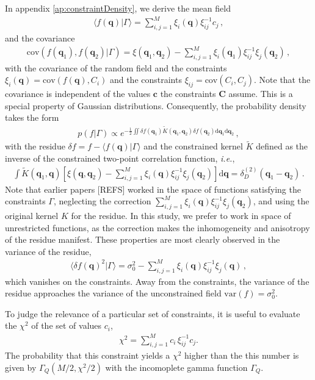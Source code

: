\documentclass[a4paper, 11pt]{article}
\begin{document}
In appendix \ref{ap:constraintDensity}, we derive the mean field
\begin{align}
\langle f(\bm{q})|\Gamma\rangle = \sum_{i,j=1}^M\xi_i (\bm{q})\xi_{ij}^{-1}c_j\,,
\end{align}
and the covariance
\begin{align}
\text{cov}(f(\bm{q}_1),f(\bm{q}_2)|\Gamma)  = \xi(\bm{q}_1,\bm{q}_2) - \sum_{i,j=1}^M\xi_i(\bm{q}_1)\xi_{ij}^{-1}\xi_j(\bm{q}_2)\,,
\end{align}
with the covariance of the random field and the constraints $\xi_{i}(\bm{q}) = \text{cov}( f(\bm{q}), C_i)$ and the constraints $\xi_{ij} = \text{cov}( C_i ,C_j)$. Note that the covariance is independent of the values $\bm{c}$ the constraints $\bm{C}$ assume. This is a special property of Gaussian distributions. Consequently, the probability density takes the form
\begin{align}
p( f|\Gamma) \propto  e^{-\frac{1}{2} \iint \delta{f}(\bm{q}_1) \tilde{K}(\bm{q}_1,\bm{q}_2) \delta f(\bm{q}_2)\mathrm{d}\bm{q}_1 \mathrm{d}\bm{q}_2 }\,,\label{eq:constraint2}
\end{align}
with the residue $\delta f = f-\langle f(\bm{q})|\Gamma\rangle$ and the constrained kernel $\tilde{K}$ defined as the inverse of the constrained two-point correlation function, \textit{i.e.},
\begin{align}
\int \tilde{K}(\bm{q}_1,\bm{q}) \left[\xi(\bm{q},\bm{q}_2) - \sum_{i,j=1}^M\xi_i(\bm{q})\xi_{ij}^{-1}\xi_j(\bm{q}_2)\right]\mathrm{d}\bm{q}= \delta_D^{(2)}(\bm{q}_1-\bm{q}_2)\,.
\end{align}
Note that earlier papers [REFS] worked in the space of functions satisfying the constraints $\Gamma$, neglecting the correction $\sum_{i,j=1}^M\xi_i(\bm{q})\xi_{ij}^{-1}\xi_j(\bm{q}_2)$, and using the original kernel $K$ for the residue. In this study, we prefer to work in space of unrestricted functions, as the correction makes the inhomogeneity and anisotropy of the residue manifest. These properties are most clearly observed in the variance of the residue,
\begin{align}
\langle \delta f(\bm{q})^2|\Gamma \rangle = \sigma_0^2- \sum_{i,j=1}^M\xi_i(\bm{q})\xi_{ij}^{-1}\xi_j(\bm{q})\,,
\end{align}
which vanishes on the constraints. Away from the constraints, the variance of the residue approaches the variance of the unconstrained  field $\text{var}(f)=\sigma_0^2$.

To judge the relevance of a particular set of constraints, it is useful to evaluate the $\chi^2$ of the set of values $c_i$,
\begin{align}
\chi^2 = \sum_{i,j=1}^M c_i\, \xi_{ij}^{-1}c_j.
\end{align}
The probability that this constraint yields a $\chi^2$ higher than the this number is given by $\Gamma_Q(M/2, \chi^2/2)$ with the incomoplete gamma function $\Gamma_Q$.
\end{document}
